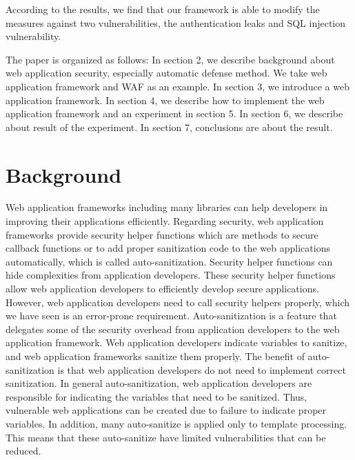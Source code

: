 \documentclass[conference]{IEEEtran}
\begin{document}
According to the results, we find that our framework is able to modify the measures against two vulnerabilities, the authentication leaks and SQL injection vulnerability.

The paper is organized as follows:
In section 2, we describe background about web application security, especially automatic defense method.
We take web application framework and WAF as an example.
In section 3, we introduce a web application framework.
In section 4, we describe how to implement the web application framework and an experiment in section 5.
In section 6, we describe about result of the experiment.
In section 7, conclusions are about the result.
\section{Background}
Web application frameworks\cite{chaudhuri2010symbolic} including many libraries can help developers in improving their applications efficiently.
Regarding security, web application frameworks provide security helper functions which are methods to secure callback functions or to add proper sanitization code to the web applications automatically, which is called auto-sanitization\cite{weinberger2011systematic}.
Security helper functions can hide complexities from application developers.
These security helper functions allow web application developers to efficiently develop secure applications.
However, web application developers need to call security helpers properly, which we have seen is an error-prone requirement.
Auto-sanitization is a feature that delegates some of the security overhead from application developers to the web application framework.
Web application developers indicate variables to sanitize, and web application frameworks sanitize them properly.
The benefit of auto-sanitization is that web application developers do not need to implement correct sanitization.
In general auto-sanitization, web application developers are responsible for indicating the variables that need to be sanitized.
Thus, vulnerable web applications can be created due to failure to indicate proper variables.
In addition, many auto-sanitize is applied only to template processing.
This means that these auto-sanitize have limited vulnerabilities that can be reduced.
\end{document}
